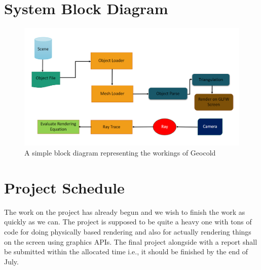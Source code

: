 \documentclass[a4paper, 12pt]{article}
\newcommand\PROJECTNAME{Geocold}
\begin{document}
\section{System Block Diagram}
\begin{center}
\begin{figure}[htb]
	\includegraphics[width=1.2\linewidth, scale=1.2]{massivesizedblockD.png}
	\centering
	\caption{A simple block diagram representing the workings of \PROJECTNAME}
	\label{figure:systemblock}
\end{figure}
\end{center}

\section{Project Schedule}
The work on the project has already begun and we 
wish to finish the work as quickly as we can. 
The project is supposed to be quite a heavy one with 
tons of code for doing physically based rendering 
and also for actually rendering things on the 
screen using graphics APIs. The final project alongside
with a report shall be submitted within the 
allocated time i.e., it should be finished by the end of July.

\newpage
\printbibliography
\end{document}
